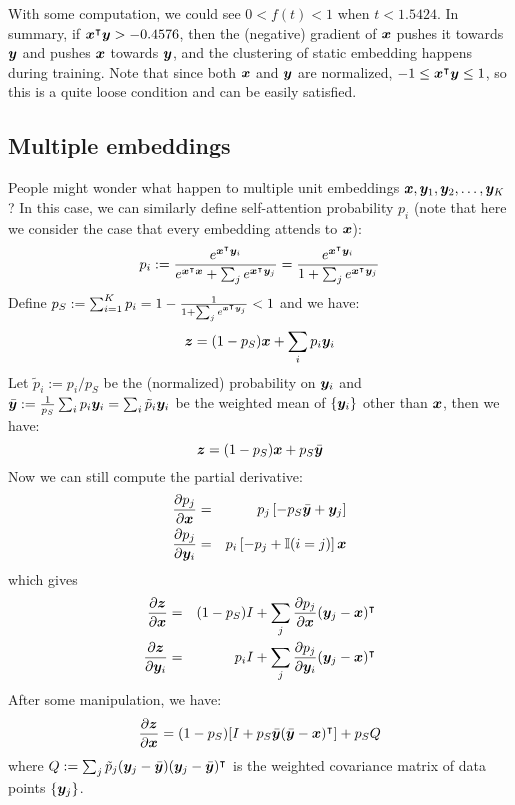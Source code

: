 With some computation, we could see $0 < f(t) < 1$ when $t < 1.5424$. In summary, if ${\bm{x}}^\intercal{\bm{y}} > -0.4576$, then the (negative) gradient of ${\bm{x}}$ pushes it towards ${\bm{y}}$ and pushes ${\bm{x}}$ towards ${\bm{y}}$, and the clustering of static embedding happens during training. Note that since both ${\bm{x}}$ and ${\bm{y}}$ are normalized, $-1 \le {\bm{x}}^\intercal{\bm{y}} \le 1$, so this is a quite loose condition and can be easily satisfied.  

\subsection{Multiple embeddings}
People might wonder what happen to multiple unit embeddings ${\bm{x}}, {\bm{y}}_1, {\bm{y}}_2, \ldots, {\bm{y}}_K$? In this case, we can similarly define self-attention probability $p_i$ (note that here we consider the case that every embedding attends to ${\bm{x}}$):
\begin{equation}
    p_i := \frac{e^{{\bm{x}}^\intercal{\bm{y}}_i}}{e^{{\bm{x}}^\intercal{\bm{x}}} + \sum_j e^{{\bm{x}}^\intercal{\bm{y}}_j}} = \frac{e^{{\bm{x}}^\intercal{\bm{y}}_i}}{1 + \sum_j e^{{\bm{x}}^\intercal{\bm{y}}_j}}
\end{equation}
Define $p_S := \sum_{i=1}^K p_i = 1 - \frac{1}{1 + \sum_j e^{{\bm{x}}^\intercal{\bm{y}}_j}} < 1$ and we have:
\begin{equation}
    {\bm{z}} = (1 - p_S) {\bm{x}} + \sum_i p_i {\bm{y}}_i
\end{equation}
Let $\tilde p_i := p_i / p_S$ be the (normalized) probability on ${\bm{y}}_i$ and $\bar{{\bm{y}}} := \frac{1}{p_S}\sum_i p_i {\bm{y}}_i = \sum_i \tilde p_i {\bm{y}}_i$ be the weighted mean of $\{{\bm{y}}_i\}$ other than ${\bm{x}}$, then we have: 
\begin{equation}
    {\bm{z}} = (1 - p_S){\bm{x}} + p_S \bar{{\bm{y}}}
\end{equation}
Now we can still compute the partial derivative:
\begin{eqnarray}
    \frac{\partial p_j}{\partial {\bm{x}}} &=& p_j \left[-p_S \bar {{\bm{y}}} + {\bm{y}}_j\right] \\
    \frac{\partial p_j}{\partial {\bm{y}}_i} &=& p_i \left[-p_j + \mathbb{I}(i = j)\right]{\bm{x}} 
\end{eqnarray}
which gives
\begin{eqnarray}
\frac{\partial {\bm{z}}}{\partial {\bm{x}}} &=& (1 - p_S)I + \sum_j \frac{\partial p_j}{\partial {\bm{x}}}({\bm{y}}_j - {\bm{x}})^\intercal  \\
\frac{\partial {\bm{z}}}{\partial {\bm{y}}_i} &=& p_i I + \sum_j \frac{\partial p_j}{\partial {\bm{y}}_i}({\bm{y}}_j - {\bm{x}})^\intercal
\end{eqnarray}
After some manipulation, we have:
\begin{equation}
\frac{\partial {\bm{z}}}{\partial {\bm{x}}} = (1-p_S) [I + p_S \bar{{\bm{y}}} (\bar {{\bm{y}}} - {\bm{x}})^\intercal ] + p_S Q 
\end{equation}
where $Q := \sum_j \tilde p_j ({\bm{y}}_j - \bar {{\bm{y}}})({\bm{y}}_j - \bar{{\bm{y}}})^\intercal$ is the weighted covariance matrix of data points $\{{\bm{y}}_j\}$. 

